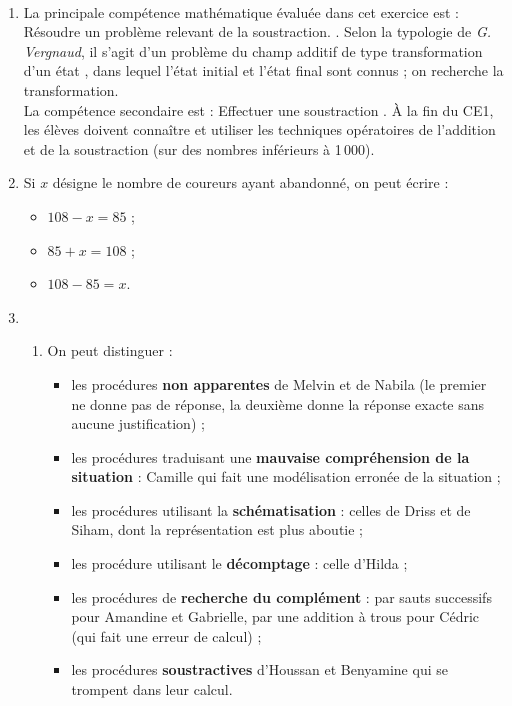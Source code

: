 \ \\ [-5mm]
\begin{enumerate}
   \item La principale compétence mathématique évaluée dans cet exercice est : \og Résoudre un problème relevant de la soustraction. \fg{}. Selon la typologie de {\it G. Vergnaud}, il s'agit d'un problème du champ additif de type \og transformation d'un état \fg, dans lequel l'état initial et l'état final sont connus ; on recherche la transformation. \\
   La compétence secondaire est : \og Effectuer une soustraction \fg{}. À la fin du CE1, les élèves doivent connaître et utiliser les techniques opératoires de l'addition et de la soustraction (sur des nombres inférieurs à 1\,000).
   \item Si $x$ désigne le nombre de coureurs ayant abandonné, on peut écrire :
   \begin{itemize}
      \item $108-x = 85$ ;
      \item $85+x =108$ ;
      \item $108-85 = x$.
   \end{itemize}
   \item
   \begin{enumerate}
      \item On peut distinguer :
      \begin{itemize}
         \item les procédures {\bf non apparentes} de Melvin et de Nabila (le premier ne donne pas de réponse, la deuxième donne la réponse exacte sans aucune justification) ;
         \item les procédures traduisant une {\bf mauvaise compréhension de la situation} : Camille qui fait une modélisation erronée de la situation ;
         \item les procédures utilisant la {\bf schématisation} : celles de Driss et de Siham, dont la représentation est plus aboutie ;
         \item les procédure utilisant le {\bf décomptage} : celle d'Hilda ;
         \item les procédures de {\bf recherche du complément} : par sauts successifs pour Amandine et Gabrielle, par une addition à trous pour Cédric (qui fait une erreur de calcul) ;
         \item les procédures {\bf soustractives} d'Houssan et Benyamine qui se trompent dans leur calcul.
      \end{itemize}
   \end{enumerate}
\end{enumerate}
